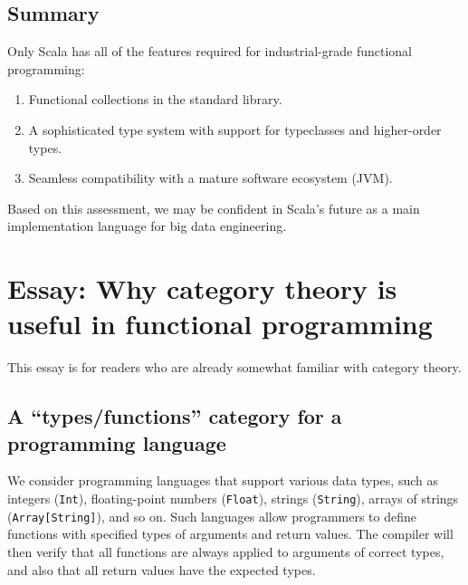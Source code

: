 \section{Summary}

Only Scala has all of the features required for industrial-grade functional
programming:
\begin{enumerate}
\item Functional collections in the standard library.
\item A sophisticated type system with support for typeclasses and higher-order
types.
\item Seamless compatibility with a mature software ecosystem (JVM).
\end{enumerate}
Based on this assessment, we may be confident in Scala\textsf{'}s future as
a main implementation language for big data engineering.

\chapter{Essay: Why category theory is useful in functional programming}

This essay is for
readers who are already somewhat familiar with category theory.

\section{A \textquotedblleft types/functions\textquotedblright{} category for
a programming language}

We consider programming languages that support various data types,
such as integers (\lstinline!Int!), floating-point numbers (\lstinline!Float!),
strings (\lstinline!String!), arrays of strings (\lstinline!Array[String]!),
and so on. Such languages allow programmers to define functions with
specified types of arguments and return values. The compiler will
then verify that all functions are always applied to arguments of
correct types, and also that all return values have the expected types. 

